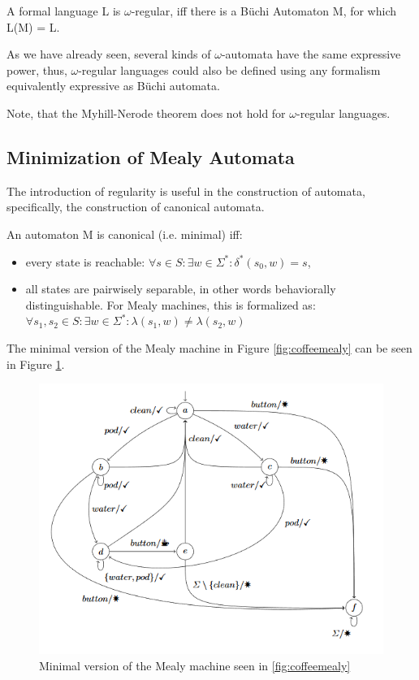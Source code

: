 \begin{definition}
	A formal language L is $\omega$-regular, iff there is a Büchi Automaton M, for which L(M) = L.
	
	As we have already seen, several kinds of $\omega$-automata have the same expressive power, thus, $\omega$-regular languages could also be defined using any formalism equivalently expressive as Büchi automata.
\end{definition}

Note, that the Myhill-Nerode theorem does not hold for $\omega$-regular languages.

\subsection{Minimization of Mealy Automata}
The introduction of regularity is useful in the construction of automata, specifically, the construction of canonical automata. 

\begin{definition}
	An automaton M is canonical (i.e. minimal) iff:
	\begin{itemize}
		\item every state is reachable: $\forall s\in S: \exists w\in\Sigma^*: \delta^*(s_0, w) = s$,
		\item all states are pairwisely separable, in other words behaviorally distinguishable. For Mealy machines, this is formalized as: $\forall s_1, s_2\in S: \exists w\in\Sigma^*: \lambda(s_1, w)\neq\lambda(s_2, w)$
	\end{itemize}
\end{definition}

The minimal version of the Mealy machine in Figure \ref{fig:coffeemealy} can be seen in Figure \ref{fig:coffeemealyminimal}.

\begin{figure}
	\centering
	\includegraphics[width=0.7\linewidth]{figures/coffeemealyminimal}
	\caption{Minimal version of the Mealy machine seen in \ref{fig:coffeemealy}}
	\label{fig:coffeemealyminimal}
\end{figure}


